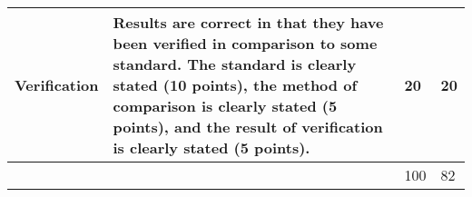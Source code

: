 \documentclass[article,12pt]{article}
\numberwithin{equation}{section}
\begin{document}
\begin{tabular}{|p{.2\linewidth}|p{.2\linewidth}|p{.2\linewidth}|p{.1\linewidth}|}
	\vspace{.2in}\textbf{Verification}        & {\tiny Results are correct in that they have been verified in comparison to some standard. The standard is clearly stated (10 points), the method of comparison is clearly stated (5 points), and the result of verification is clearly stated (5 points).}                                                                                                      & \vspace{.2in}20              &   \vspace{.2in}20    \\ \hline
	&                                                                                                                                                                                                                                                                                                                                                          & \vspace{.02in}100             &   \vspace{.02in}82     \\ \hline
\end{tabular}
\end{document}
